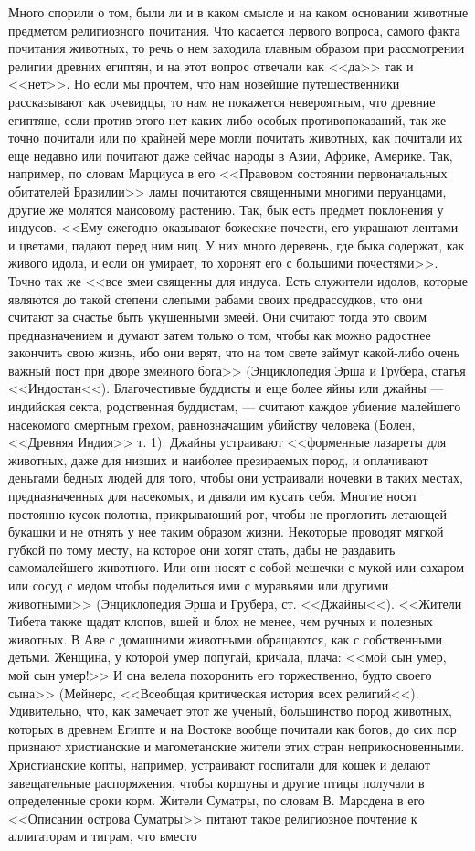 \documentclass[12pt]{article}
\begin{document}
Много спорили о том, были ли и в каком смысле и на каком основании животные предметом религиозного почитания. Что касается первого вопроса, самого факта почитания животных, то речь о нем заходила главным образом при рассмотрении религии древних египтян, и на этот вопрос отвечали как <<да>>  так и <<нет>>. Но если мы прочтем, что нам новейшие путешественники рассказывают как очевидцы, то нам не покажется невероятным, что древние египтяне, если против этого нет каких-либо особых противопоказаний, так же точно почитали или по крайней мере могли почитать животных, как почитали их еще недавно или почитают даже сейчас народы в Азии, Африке, Америке. Так, например, по словам Марциуса в его <<Правовом состоянии первоначальных обитателей Бразилии>>  ламы почитаются священными многими перуанцами, другие же молятся маисовому растению. Так, бык есть предмет поклонения у индусов. <<Ему ежегодно оказывают божеские почести, его украшают лентами и цветами, падают перед ним ниц. У них много деревень, где быка содержат, как живого идола, и если он умирает, то хоронят его с большими почестями>>. Точно так же <<все змеи священны для индуса. Есть служители идолов, которые являются до такой степени слепыми рабами своих предрассудков, что они считают за счастье быть укушенными змеей. Они считают тогда это своим предназначением и думают затем только о том, чтобы как можно радостнее закончить свою жизнь, ибо они верят, что на том свете займут какой-либо очень важный пост при дворе змеиного бога>> (Энциклопедия Эрша и Грубера, статья <<Индостан<<). Благочестивые буддисты и еще более яйны или джайны --- индийская секта, родственная буддистам, --- считают каждое убиение малейшего насекомого смертным грехом, равнозначащим убийству человека (Болен, <<Древняя Индия>>  т. 1). Джайны устраивают <<форменные лазареты для животных, даже для низших и наиболее презираемых пород, и оплачивают деньгами бедных людей для того, чтобы они устраивали ночевки в таких местах, предназначенных для насекомых, и давали им кусать себя. Многие носят постоянно кусок полотна, прикрывающий рот, чтобы не проглотить летающей букашки и не отнять у нее таким образом жизни. Некоторые проводят мягкой губкой по тому месту, на которое они хотят стать, дабы не раздавить самомалейшего животного. Или они носят с собой мешечки с мукой или сахаром или сосуд с медом чтобы поделиться ими с муравьями или другими животными>> (Энциклопедия Эрша и Грубера, ст. <<Джайны<<). <<Жители Тибета также щадят клопов, вшей и блох не менее, чем ручных и полезных животных. В Аве с домашними животными обращаются, как с собственными детьми. Женщина, у которой умер попугай, кричала, плача: <<мой сын умер, мой сын умер!>> И она велела похоронить его торжественно, будто своего сына>> (Мейнерс, <<Всеобщая критическая история всех религий<<). Удивительно, что, как замечает этот же ученый, большинство пород животных, которых в древнем Египте и на Востоке вообще почитали как богов, до сих пор признают христианские и магометанские жители этих стран неприкосновенными. Христианские копты, например, устраивают госпитали для кошек и делают завещательные распоряжения, чтобы коршуны и другие птицы получали в определенные сроки корм. Жители Суматры, по словам В. Марсдена в его <<Описании острова Суматры>>  питают такое религиозное почтение к аллигаторам и тиграм, что вместо 
\end{document}
